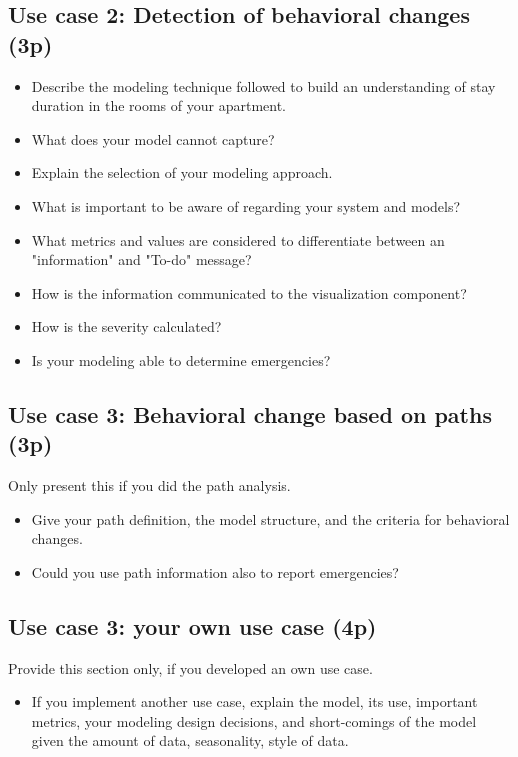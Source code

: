 \documentclass[A4,10pt]{article}
\begin{document}
\subsection{ Use case 2: Detection of behavioral changes (3p)}

\begin{itemize}
	\item Describe the modeling technique followed to build an understanding of stay duration in the rooms of your apartment.
	\item What does your model cannot capture?
	\item Explain the selection of your modeling approach.
	\item What is important to be aware of regarding your system and models?
	\item What metrics and values are considered to differentiate between an "information" and "To-do" message?
	\item How is the information communicated to the visualization component?
	\item How is the severity calculated? 
	\item Is your modeling able to determine emergencies?
\end{itemize}


\subsection{ Use case 3: Behavioral change based on paths (3p)}

Only present this if you did the path analysis.

\begin{itemize}
	\item Give your path definition, the model structure, and the criteria for behavioral changes.
	\item Could you use path information also to report emergencies?
\end{itemize}


\subsection{ Use case 3: your own use case (4p)}

Provide this section only, if you developed an own use case.

\begin{itemize}
	\item If you implement another use case, explain the model, its use, important metrics, your modeling design decisions, and short-comings of the model given the amount of data, seasonality, style of data.
\end{itemize}
\end{document}
